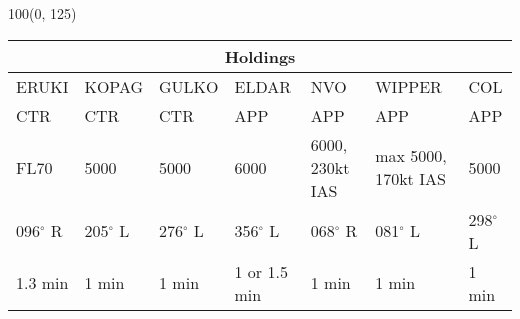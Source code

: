 \documentclass[10pt,landscape,a4paper]{article}
\begin{document}
\begin{textblock}{100}(0, 125)
\begin{table}[]
\begin{tabular}{lllllll} 
\multicolumn{7}{c}{\textbf{Holdings}}                                                                                                                                          \\ \hline
\multicolumn{1}{|l|}{ERUKI} &                                                                                                                                              
\multicolumn{1}{l|}{KOPAG} &                                                                                                                                            
\multicolumn{1}{l|}{GULKO} &                                                                                                                                              
\multicolumn{1}{l|}{ELDAR} &                                                                                                                                       
\multicolumn{1}{l|}{NVO} & 
\multicolumn{1}{l|}{WIPPER} & 
\multicolumn{1}{l|}{COL} \\ \hline
\multicolumn{1}{|l|}{CTR} & 
\multicolumn{1}{l|}{CTR} & 
\multicolumn{1}{l|}{CTR} & 
\multicolumn{1}{l|}{APP} & 
\multicolumn{1}{l|}{APP} & 
\multicolumn{1}{l|}{APP} & 
\multicolumn{1}{l|}{APP} \\
\multicolumn{1}{|l|}{FL70} & 
\multicolumn{1}{l|}{5000} & 
\multicolumn{1}{l|}{5000} & 
\multicolumn{1}{l|}{6000} & 
\multicolumn{1}{l|}{6000, 230kt IAS} & 
\multicolumn{1}{l|}{max 5000, 170kt IAS} & 
\multicolumn{1}{l|}{5000} \\
\multicolumn{1}{|l|}{096$^\circ$ R} & 
\multicolumn{1}{l|}{205$^\circ$ L} & 
\multicolumn{1}{l|}{276$^\circ$ L} & 
\multicolumn{1}{l|}{356$^\circ$ L} & 
\multicolumn{1}{l|}{068$^\circ$ R} & 
\multicolumn{1}{l|}{081$^\circ$ L} & 
\multicolumn{1}{l|}{298$^\circ$ L} \\
\multicolumn{1}{|l|}{1.3 min} & 
\multicolumn{1}{l|}{1 min} & 
\multicolumn{1}{l|}{1 min} & 
\multicolumn{1}{l|}{1 or 1.5 min} & 
\multicolumn{1}{l|}{1 min} & 
\multicolumn{1}{l|}{1 min} & 
\multicolumn{1}{l|}{1 min} \\ \hline
\end{tabular}
\end{table}
\end{textblock}
\end{document}

